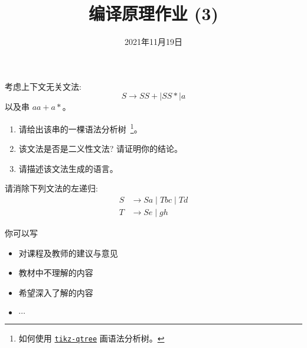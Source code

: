 \documentclass[a4paper, justified]{tufte-handout}
\title{编译原理作业 (3)}
\date{2021年11月19日}
\begin{document}
\maketitle
\noplagiarism %
\begin{abstract}
\end{abstract}
\beginrequired

\begin{problem}[\score{10 = 4 + 4 + 2}]
  考虑上下文无关文法:
  \[
    S \to S S + \mid S S \ast \mid a
  \]
  以及串 $a a + a \ast$。

  \begin{enumerate}[(1)]
    \item 请给出该串的一棵语法分析树~\footnote{如何使用 \href{https://mirrors.hit.edu.cn/CTAN/graphics/pgf/contrib/tikz-qtree/tikz-qtree-manual.pdf}{\texttt{tikz-qtree}} 画语法分析树。}。
    \item 该文法是否是二义性文法? 请证明你的结论。
    \item 请描述该文法生成的语言。
  \end{enumerate}
\end{problem}

\begin{solution}
\end{solution}

\begin{problem}[\score{10}]
  请消除下列文法的左递归:
  \begin{align*}
    S &\to Sa \mid Tbc \mid Td \\[8pt]
    T &\to Se \mid gh
  \end{align*}
\end{problem}

\begin{solution}
\end{solution}



\beginfb

你可以写
\begin{itemize}
  \item 对课程及教师的建议与意见
  \item 教材中不理解的内容
  \item 希望深入了解的内容
  \item $\cdots$
\end{itemize}
\end{document}
